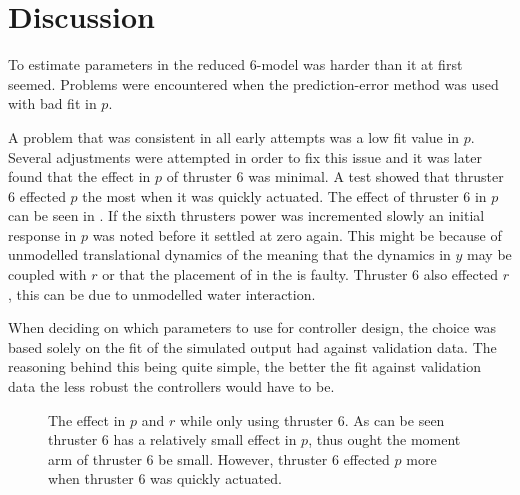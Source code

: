 \section{Discussion}
To estimate parameters in the reduced 6-\abbrDOF model was harder than it at first seemed. Problems were encountered when the prediction-error method was used with bad fit in $p$. 





A problem that was consistent in all early attempts was a low fit value in $p$. Several adjustments were attempted in order to fix this issue and it was later found that the effect in $p$ of thruster 6 was minimal. A test showed that thruster 6 effected $p$ the most when it was quickly actuated. The effect of thruster 6 in $p$ can be seen in . If the sixth thrusters power was incremented slowly an initial response in $p$ was noted before it settled at zero again. This might be because of unmodelled translational dynamics of the \abbrROV meaning that the dynamics in $y$ may be coupled with $r$ or that the placement of \abbrCG in the \abbrROV is faulty. Thruster 6 also effected $r$, this can be due to unmodelled water interaction.

When deciding on which parameters to use for controller design, the choice was based solely on the fit of the simulated output had against validation data. The reasoning behind this being quite simple, the better the fit against validation data the less robust the controllers would have to be.


\begin{figure}
\centering
  \qquad
  \qquad
  \caption{\label{fig:thruster6}%
  The effect in $p$ and $r$ while only using thruster 6. As can be seen thruster 6 has a relatively small effect in $p$, thus ought the moment arm of thruster 6 be small. However, thruster 6 effected $p$ more when thruster 6 was quickly actuated.}
\end{figure}

